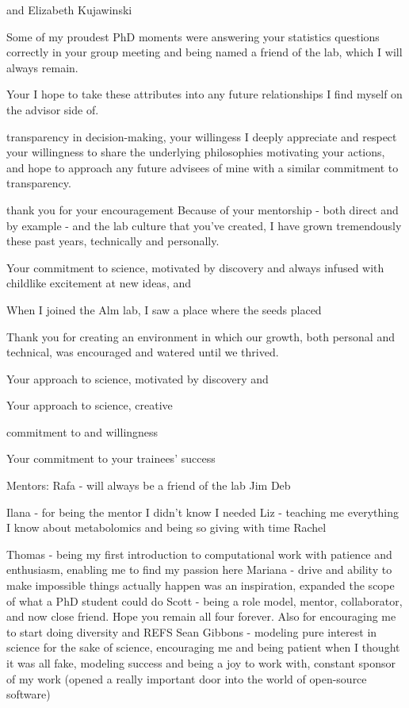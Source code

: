and Elizabeth Kujawinski




Some of my proudest PhD moments were answering your statistics questions correctly in your group meeting and being named a friend of the lab, which I will always remain.

Your
I hope to take these attributes into any future relationships I find myself on the advisor side of.

transparency in decision-making, your willingess
I deeply appreciate and respect your willingness to share the underlying philosophies motivating your actions, and hope to approach any future advisees of mine with a similar commitment to transparency.



thank you for your encouragement
Because of your mentorship - both direct and by example - and the lab culture that you've created, I have grown tremendously these past years, technically and personally.

Your commitment to science, motivated by discovery and always infused with childlike excitement at new ideas, and



When I joined the Alm lab, I saw a place where the seeds placed

Thank you for creating an environment in which our growth, both personal and technical, was encouraged and watered until we thrived.

Your approach to science, motivated by discovery and

Your approach to science, creative

commitment to and willingness

Your commitment to your trainees' success

Mentors:
Rafa - will always be a friend of the lab
Jim
Deb

Ilana - for being the mentor I didn't know I needed
Liz - teaching me everything I know about metabolomics and being so giving with time
Rachel

Thomas - being my first introduction to computational work with patience and enthusiasm, enabling me to find my passion here
Mariana - drive and ability to make impossible things actually happen was an inspiration, expanded the scope of what a PhD student could do
Scott - being a role model, mentor, collaborator, and now close friend. Hope you remain all four forever. Also for encouraging me to start doing diversity and REFS
Sean Gibbons - modeling pure interest in science for the sake of science, encouraging me and being patient when I thought it was all fake, modeling success and being a joy to work with, constant sponsor of my work (opened a really important door into the world of open-source software)

